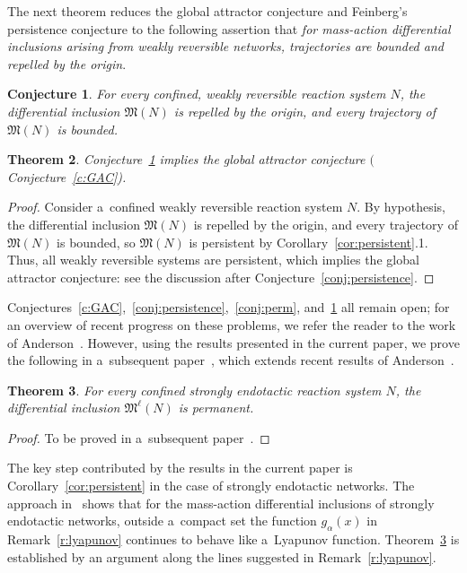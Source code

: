 \documentclass[pdftex]{sigma}
\newtheorem{Theorem}{Theorem}[section]
\newtheorem{Conjecture}[Theorem]{Conjecture}
\begin{document}
The next theorem reduces the global attractor conjecture and Feinberg's persistence conjecture to the following
assertion that \emph{for mass-action differential inclusions arising from weakly reversible networks, trajectories
are bounded and repelled by the origin}.
\begin{Conjecture}
\label{conj:wr_are_repelled_bounded}
For every confined, weakly reversible reaction system $N$, the differential inclusion $\mathfrak{M}(N)$ is repelled
by the origin, and every trajectory of~$\mathfrak{M}(N)$ is bounded.
\end{Conjecture}
\begin{Theorem}
\label{t:bdd_tra_orig_rep=>conjs}
Conjecture~{\rm \ref{conj:wr_are_repelled_bounded}} implies the global attractor conjecture $($Conjecture~{\rm \ref{c:GAC})}.
\end{Theorem}
\begin{proof}
Consider a~conf\/ined weakly reversible reaction system $N$.
By hypothesis, the dif\/ferential inclusion $\mathfrak{M}(N)$ is repelled by the origin, and every trajectory of
$\mathfrak{M}(N)$ is bounded, so $\mathfrak{M}(N)$ is persistent by Corollary~\ref{cor:persistent}.1.
Thus, all weakly reversible systems are persistent, which implies the global attractor conjecture: see the discussion
after Conjecture~\ref{conj:persistence}.
\end{proof}

Conjectures~\ref{c:GAC},~\ref{conj:persistence},~\ref{conj:perm}, and~\ref{conj:wr_are_repelled_bounded} all remain
open; for an overview of recent progress on these problems, we refer the reader to the work of Anderson~\cite[\S~1.1]{Anderson08}.
However, using the results presented in the current paper, we prove the following in a~subsequent paper~\cite{GeoGAC},
which extends recent results of Anderson~\cite{Anderson11}.
\begin{Theorem}
\label{thm:strong_endotactic}
For every confined strongly endotactic reaction system $N$, the differential inclusion $\mathfrak M^\ell(N)$ is
permanent.
\end{Theorem}
\begin{proof}
To be proved in a~subsequent paper~\cite{GeoGAC}.
\end{proof}

The key step contributed by the results in the current paper is Corollary~\ref{cor:persistent} in the case of strongly
endotactic networks.
The approach in~\cite{GeoGAC} shows that for the mass-action dif\/ferential inclusions of strongly endotactic networks,
outside a~compact set the function $g_\alpha(x)$ in Remark~\ref{r:lyapunov} continues to behave like a~Lyapunov
function.
Theorem~\ref{thm:strong_endotactic} is established by an argument along the lines suggested in Remark~\ref{r:lyapunov}.
\end{document}
